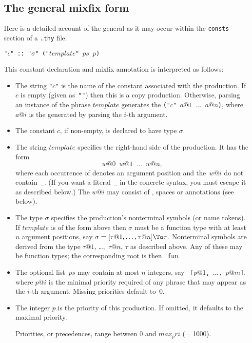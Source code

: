 \subsection{The general mixfix form}
Here is a detailed account of the general  as
it may occur within the {\tt consts} section of a {\tt .thy} file.
\begin{center}
  {\tt "$c$" ::\ "$\sigma$" ("$template$" $ps$ $p$)}
\end{center}
This constant declaration and mixfix annotation is interpreted as follows:
\begin{itemize}
\item The string {\tt "$c$"} is the name of the constant associated with
  the production.  If $c$ is empty (given as~{\tt ""}) then this is a copy
  production. Otherwise, parsing an instance of the
  phrase $template$ generates the \AST{} {\tt ("$c$" $a@1$ $\ldots$
    $a@n$)}, where $a@i$ is the \AST{} generated by parsing the $i$-th
  argument.

  \item The constant $c$, if non-empty, is declared to have type $\sigma$.

  \item The string $template$ specifies the right-hand side of
    the production.  It has the form
    \[ w@0 \;_\; w@1 \;_\; \ldots \;_\; w@n, \] 
    where each occurrence of \ttindex{_} denotes an
    argument position and the~$w@i$ do not
    contain~{\tt _}.  (If you want a literal~{\tt _} in the concrete
    syntax, you must escape it as described below.)  The $w@i$ may
    consist of , spaces or  annotations (see below).

  \item The type $\sigma$ specifies the production's nonterminal symbols (or name
    tokens).  If $template$ is of the form above then $\sigma$ must be a
    function type with at least~$n$ argument positions, say $\sigma =
    [\tau@1, \dots, \tau@n] \To \tau$.  Nonterminal symbols are derived
    from the type $\tau@1$, \ldots,~$\tau@n$, $\tau$ as described above.
    Any of these may be function types; the corresponding root is then {\tt
      fun}. 

  \item The optional list~$ps$ may contain at most $n$ integers, say {\tt
      [$p@1$, $\ldots$, $p@m$]}, where $p@i$ is the minimal
    priority required of any phrase that may appear
    as the $i$-th argument.  Missing priorities default to~$0$.

  \item The integer $p$ is the priority of this production.  If omitted, it
    defaults to the maximal priority.

    Priorities, or precedences, range between $0$ and
    $max_pri$ (= 1000).
\end{itemize}

